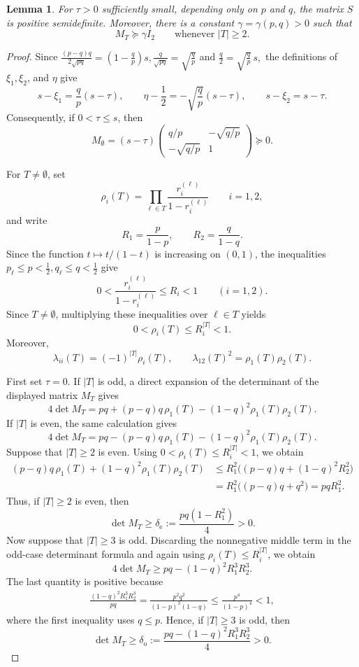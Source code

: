 \documentclass[11pt]{article}
\numberwithin{equation}{section}
\newtheorem{lemma}[theorem]{Lemma}
\theoremstyle{definition}
\theoremstyle{remark}
\begin{document}
\begin{lemma}\label{lem:semidefinite-gap}
For $\tau>0$ sufficiently small, depending only on $p$ and $q$,
the matrix $ S$ is positive semidefinite.  Moreover, there is
a constant $\gamma=\gamma(p,q)>0$ such that
$$
 M_T\succeq\gamma I_2
 \qquad\text{whenever }|T|\geq2.
$$
\end{lemma}

\begin{proof}
Since
$
 \frac{(p-q)q}{2\sqrt{pq}}
 =
 \left(1-\frac qp\right)s,
 \frac q{\sqrt{pq}}=\sqrt{\frac qp}
$
and
$
 \frac q2=\sqrt{\frac qp}\,s,
$
the definitions of $\xi_1,\xi_2$, and $\eta$ give
$$
 s-\xi_1=\frac qp(s-\tau),
 \qquad
 \eta-\frac12=-\sqrt{\frac qp}(s-\tau),
 \qquad
 s-\xi_2=s-\tau.
$$
Consequently, if $0<\tau\leq s$, then
$$
 M_{\emptyset}
 =
 (s-\tau)
 \begin{pmatrix}
  q/p&-\sqrt{q/p}\\
  -\sqrt{q/p}&1
 \end{pmatrix}
 \succeq0.
$$

For $T\neq\emptyset$, set
$$
 \rho_i(T)
 =
 \prod_{\ell\in T}
 \frac{r_i^{(\ell)}}{1-r_i^{(\ell)}}
 \qquad i=1,2,
$$
and write
$$
 R_1=\frac p{1-p},
 \qquad
 R_2=\frac q{1-q}.
$$
Since the function $t\mapsto t/(1-t)$ is increasing on $(0,1)$,
the inequalities
$
 p_\ell\leq p<\frac12,
 q_\ell\leq q<\frac12
$
give
$$
 0<
 \frac{r_i^{(\ell)}}{1-r_i^{(\ell)}}
 \leq R_i<1
 \qquad(i=1,2).
$$
Since $T\neq\emptyset$, multiplying these inequalities over
$\ell\in T$ yields
$$
 0<\rho_i(T)\leq R_i^{|T|}<1.
$$
Moreover,
$$
 \lambda_{ii}(T)=(-1)^{|T|}\rho_i(T),
 \qquad
 \lambda_{12}(T)^2=\rho_1(T)\rho_2(T).
$$

First set $\tau=0$.  If $|T|$ is odd, a direct expansion of the
determinant of the displayed matrix $M_T$ gives
$$
 4\det M_T
 =
 pq+(p-q)q\,\rho_1(T)
 -(1-q)^2\rho_1(T)\rho_2(T).
$$
If $|T|$ is even, the same calculation gives
$$
 4\det M_T
 =
 pq-(p-q)q\,\rho_1(T)
 -(1-q)^2\rho_1(T)\rho_2(T).
$$
Suppose that $|T|\geq2$ is even.  Using
$0<\rho_i(T)\leq R_i^{|T|}<1$, we obtain
$$
\begin{aligned}
 (p-q)q\,\rho_1(T)
 +(1-q)^2\rho_1(T)\rho_2(T)&\leq
 R_1^2\bigl((p-q)q+(1-q)^2R_2^2\bigr)\\
 &=
 R_1^2\bigl((p-q)q+q^2\bigr)
 =pqR_1^2.
\end{aligned}
$$
Thus, if $|T|\geq2$ is even,  then
$$
 \det M_T
 \geq
 \delta_{\mathrm e}
 :=
 \frac{pq(1-R_1^2)}4>0.
$$
Now suppose that $|T|\geq3$ is odd.  Discarding the nonnegative
middle term in the odd-case determinant formula and again using
$\rho_i(T)\leq R_i^{|T|}$, we obtain
$$
 4\det M_T
 \geq
 pq-(1-q)^2R_1^3R_2^3.
$$
The last quantity is positive because
$$
\begin{aligned}
 \frac{(1-q)^2R_1^3R_2^3}{pq}
=
 \frac{p^2q^2}{(1-p)^3(1-q)}\leq
 \frac{p^4}{(1-p)^4}
 <1,
\end{aligned}
$$
where the first inequality uses $q\leq p$.  Hence, if $|T|\geq3$ is odd,  then
$$
 \det M_T
 \geq
 \delta_{\mathrm o}
 :=
 \frac{pq-(1-q)^2R_1^3R_2^3}{4}>0.
$$


\end{proof}
\end{document}
